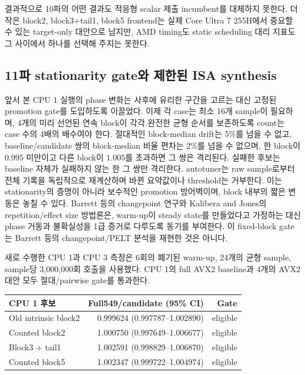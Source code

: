 \documentclass[11pt,a4paper]{article}
\begin{document}
결과적으로 10파의 어떤 결과도 적응형 scalar 제출 incumbent를 대체하지
못한다.  더 작은 block2, block3+tail1, block5 frontend는 실제 Core
Ultra 7 255H에서 중요할 수 있는 target-only 대안으로 남지만, AMD
timing도 static scheduling 대리 지표도 그 사이에서 하나를 선택해
주지는 못한다.

\subsection{11파 stationarity gate와 제한된 ISA synthesis}

앞서 본 CPU 1 실행의 phase 변화는 사후에 유리한 구간을 고르는 대신
고정된 promotion gate를 도입하도록 이끌었다.  이제 각 case는 최소
16개 sample이 필요하며, 4개의 미리 선언된 연속 block이 각각 완전한
균형 순서를 보존하도록 count는 case 수의 4배의 배수여야 한다.
절대적인 block-median drift는 5\%를 넘을 수 없고, baseline/candidate
쌍의 block-median 비율 편차는 2\%를 넘을 수 없으며, 한 block이
$0.995$ 미만이고 다른 block이 $1.005$를 초과하면 그 쌍은 격리된다.
실패한 후보는 baseline 자체가 실패하지 않는 한 그 쌍만 격리한다.
autotuner는 raw sample로부터 전체 기록을 독립적으로 재계산하며 바뀐
요약값이나 threshold는 거부한다.  이는 stationarity의 증명이 아니라
보수적인 promotion 방어벽이며, block 내부의 짧은 변동은 놓칠 수 있다.
Barrett 등의 changepoint 연구와 Kalibera and Jones의 repetition/effect
size 방법론은, warm-up이 steady state를 만들었다고 가정하는 대신 phase
거동과 불확실성을 1급 증거로 다루도록 동기를 부여한다.  이 fixed-block
gate는 Barrett 등의 changepoint/PELT 분석을 재현한 것은 아니다.

새로 수행한 CPU 1과 CPU 3 측정은 6회의 폐기된 warm-up, 24개의 균형
sample, sample당 3,000,000회 호출을 사용했다.  CPU 1의 full AVX2
baseline과 4개의 AVX2 대안 모두 절대/pairwise gate를 통과한다.

\begin{center}
\small
\begin{tabular}{lrr}
\toprule
CPU 1 후보 & Full549/candidate (95\% CI) & Gate \\
\midrule
Old intrinsic block2 & 0.999624 (0.997787--1.002890) & eligible \\
Counted block2 & 1.000750 (0.997649--1.006677) & eligible \\
Block3 + tail1 & 1.002591 (0.998829--1.006870) & eligible \\
Counted block5 & 1.002347 (0.999722--1.004974) & eligible \\
\bottomrule
\end{tabular}
\end{center}
\end{document}
